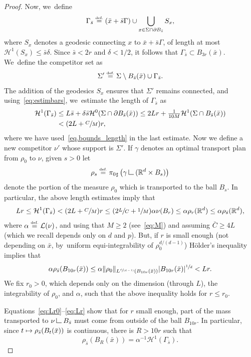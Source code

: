 \documentclass[10pt]{amsart}
\newcommand\mto{\mathchoice{\longmapsto}{\mapsto}{\mapsto}{\mapsto}}
\newcommand{\spfrac}[2]{\sfrac{#1}{(#2)}}
\theoremstyle{definition}
\newcommand{\eqdef}{\ensuremath{\stackrel{\mbox{\upshape\tiny def.}}{=}}}
\newcommand\LM[1]{\hbox{\vrule width.5pt \vbox to#1pt{\vfill \hrule width#1pt height.5pt}}}
\newcommand\LL{{\mathchoice {\>\LM7\>}{\>\LM7\>}{\,\LM5\,}{\,\LM{3.35}\,}}}
\newcommand{\mres}{\LL}
\newcommand\cH{\mathcal{H}}
\newcommand\cL{\mathcal{L}}
\newcommand{\RR}{\mathbb{R}}
\begin{document}
\begin{proof}
Now, we~define
\[
\Gamma_{\bar s} \eqdef (\bar x + \bar s \Gamma) \cup \bigcup_{x \in \Sigma \cap \partial B_{\bar s}} S_x,
\]
where $S_x$ denotes a geodesic connecting $x$ to $\bar x + \bar s \Gamma$, of
length at most $\cH^1(S_x)\le \bar s\delta$.
Since $\bar s<2r$ and $\delta<1/2$, it follows that $\Gamma_{\bar s} \subset B_{3r}(\bar x)$. We~define the competitor set as
\[
\Sigma' \eqdef \Sigma \setminus B_{\bar s}(\bar x) \cup \Gamma_{\bar s}.
\]
The addition of the geodesics $S_x$ ensures that $\Sigma'$ remains connected, and using~\eqref{eq:estimbars}, we~estimate the length of $\Gamma_{\bar s}$ as
\begin{equation}\label{eq:lengthGamma}
\begin{aligned}
\cH^1(\Gamma_{\bar s})
&\le L\bar s + \delta\bar s\cH^0(\Sigma\cap\partial B_{\bar s}(\bar x))
\le 2Lr + \tfrac{1}{10M}\cH^1(\Sigma\cap B_{\bar s}(\bar x))\\
&< (2L + \sfrac{C}{M})r,
\end{aligned}
\end{equation}
where we have used~\eqref{eq.bounds_length} in the last estimate.
Now we define a new competitor $\nu'$ whose support is $\Sigma'$. If $\gamma$ denotes an optimal transport plan from $\rho_0$ to $\nu$, given $s >0$ let
\[
\rho_{s} \eqdef {\pi_{0}}_\sharp\left(\gamma \mres(\RR^d\times B_{s})\right)
\]
denote the portion of the measure $\rho_0$ which is transported to the ball $B_{s}$. In particular, the above length estimates imply that
\begin{equation}\label{eq:Lr0}
Lr
\le
\cH^1(\Gamma_{\bar s})
<
(2L+\sfrac{C}{M})r
\le
(2\sfrac{L}{C}+\sfrac{1}{M})\alpha\nu(B_r)
\le
\alpha \rho_r(\RR^d)\leq \alpha \rho_{\bar s}(\RR^d),
\end{equation}
where $\alpha\eqdef\cL(\nu)$, and using that $M\ge 2$ (see~\eqref{eq:M}) and assuming $\bar C\ge 4L$ (which we recall depends
only on $d$ and $p$).
But, if $r$ is small enough (not depending on $\bar x$, by~uniform equi-integrability
of $\rho_0^{d/(d-1)}$) Hölder's inequality implies that
\begin{equation}\label{eq:Lr}
\alpha \rho_{\bar s}(B_{10r}(\bar x))
\le
\alpha\|\rho_0\|_{L^{\spfrac{d}{d-1}}(B_{10r}(\bar x))}
|B_{10r}(\bar x)|^{\sfrac{1}{d}} < Lr.
\end{equation}
We fix $r_0>0$, which depends only on the dimension (through $L$), the integrability of $\rho_0$, and $\alpha$, such that the above inequality holds for $r\le r_0$.

Equations~\eqref{eq:Lr0}--\eqref{eq:Lr} show that for $r$ small enough, part of the mass transported to $\nu \mres B_{\bar s}$ must come from outside of the ball $B_{10r}$. In particular, since $t \mto \rho_{\bar s}(B_t(\bar x))$ is continuous, there is $R > 10r$ such that
\begin{equation}\label{equation.mass_inNout_BR}
\rho_{\bar s}(B_R(\bar x)) = \alpha^{-1}\cH^1(\Gamma_{\bar s}).
\end{equation}


\end{proof}
\end{document}

